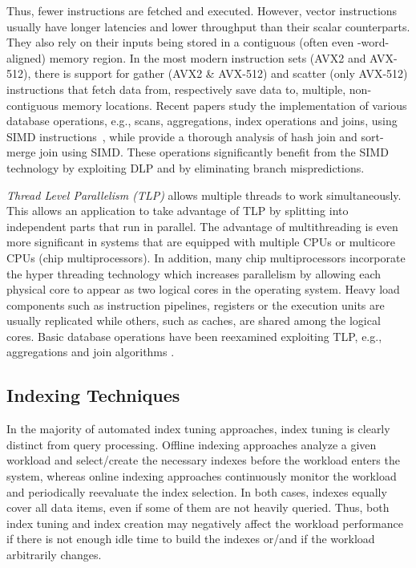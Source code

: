 Thus, fewer instructions are fetched and executed.  However, vector
instructions usually have longer latencies and lower throughput than
their scalar counterparts. They also rely on their inputs being stored
in a contiguous (often even \simd{}-word-aligned) memory region. In
the most modern instruction sets (AVX2 and AVX-512), there is support
for gather (AVX2 \& AVX-512) and scatter (only AVX-512) instructions
that fetch data from, respectively save data to, multiple, non-contiguous memory locations.
Recent papers study the implementation of various database operations,
e.g., scans, aggregations, index operations and joins, using SIMD
instructions~\cite{database_SIMD}, while \cite{hash_join_rev,
  hash_sort_SIMD} provide a thorough analysis of hash join and
sort-merge join using SIMD.  These operations significantly benefit
from the SIMD technology by exploiting DLP and by eliminating branch
mispredictions.

\emph{Thread Level Parallelism (TLP)} allows multiple threads to work
simultaneously.  This allows an application to take advantage of TLP
by splitting into independent parts that run in parallel.  The
advantage of multithreading is even more significant in systems that
are equipped with multiple CPUs or multicore CPUs (chip
multiprocessors).  In addition, many chip multiprocessors incorporate
the hyper threading technology which increases parallelism by allowing
each physical core to appear as two logical cores in the operating
system. Heavy load components such as instruction pipelines, registers or
the execution units are usually replicated while others, such as caches,
are shared among the logical cores.  Basic database operations have
been reexamined exploiting TLP, e.g., aggregations \cite{aggr_tlp} and
join algorithms \cite{hash_join_rev,hash_sort_SIMD}.


\subsection*{Indexing Techniques}
\label{sec:indexing-techniques} In the majority of automated index
tuning approaches, index tuning is clearly distinct from query
processing.  Offline indexing approaches
\cite{DBLP:conf/vldb/AgrawalCKMNS04, DBLP:conf/vldb/DagevilleDDYZZ04,
DBLP:conf/vldb/ZilioRLLSGF04} analyze a given workload and
select/create the necessary indexes before the workload enters the
system, whereas online indexing approaches
\cite{DBLP:conf/icde/BrunoC07, DBLP:conf/icde/LuhringSSS07,
DBLP:conf/sigmod/SchnaitterAMP06} continuously monitor the workload
and periodically reevaluate the index selection.  In both cases,
indexes equally cover all data items, even if some of them are not
heavily queried.  Thus, both index tuning and index creation may
negatively affect the workload performance if there is not enough idle
time to build the indexes or/and if the workload arbitrarily changes.

